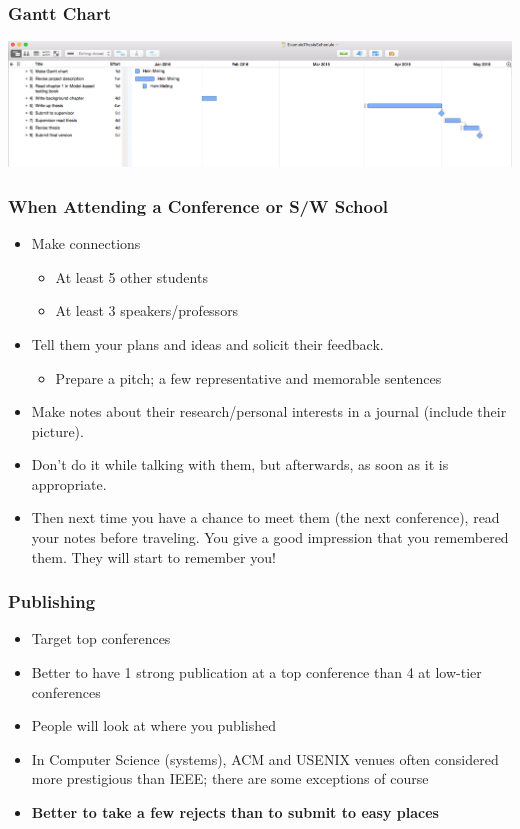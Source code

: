 \documentclass[hyperref={pdfpagelabels=false}, aspectratio=1610]{beamer}
\begin{document}
\begin{frame}
\frametitle{Gantt Chart}
 \begin{center}
  \includegraphics[scale=0.25]{fig/gantt-example}
 \end{center}
\end{frame}

\begin{frame}
\frametitle{When Attending a Conference or S/W School}
\begin{block}{}
 \begin{itemize}
  \item Make connections
  \begin{itemize}
  	\item At least 5 other students
	\item At least 3 speakers/professors
  \end{itemize}
  \item Tell them your plans and ideas and solicit their feedback.
  \begin{itemize}
  	\item Prepare a pitch; a few representative and memorable sentences
  \end{itemize}
  \item Make notes about their research/personal interests in a journal (include their picture).
  \item Don't do it while talking with them, but afterwards, as soon as it is appropriate.
  \item Then next time you have a chance to meet them (the next conference), read your notes before traveling. You give a good impression that you remembered them. They will start to remember you!
 \end{itemize}
\end{block}
\end{frame}

\begin{frame}
\frametitle{Publishing}
\begin{block}{}
 \begin{itemize}
  \item Target top conferences
  \item Better to have 1 strong publication at a top conference 
        than 4 at low-tier conferences
  \item People will look at where you published
  \item In Computer Science (systems), ACM and USENIX venues often considered more prestigious than IEEE; there are some exceptions of course
  \item \textbf{Better to take a few rejects than to submit to easy places}
 \end{itemize}
\end{block}
\end{frame}
\end{document}
